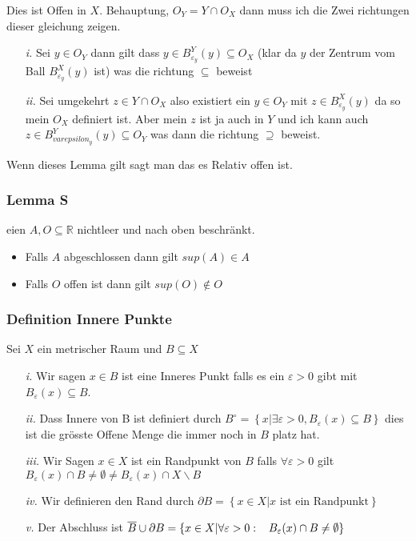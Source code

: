\documentclass{article}
\newcommand{\smspc}{\hspace{0.3cm}}
\newcommand{\lemma}[1]{\subsubsection*{Lemma {#1}}}
\newcommand{\definition}[1]{\subsubsection*{Definition {#1}}}
\begin{document}
Dies ist Offen in $X$. Behauptung, $O_Y=Y\cap O_X$ dann muss ich die Zwei richtungen dieser gleichung zeigen.
\begin{itemize}
  \item[\textit{i.}]{Sei $y\in O_Y$ dann gilt dass $y\in B_{\varepsilon_y}^Y(y)\subseteq O_X$ (klar da $y$ der Zentrum vom Ball $B_{\varepsilon_y}^X(y)$ ist) was die richtung $\subseteq$ beweist}
  \item[\textit{ii.}]{Sei umgekehrt $z\in Y\cap O_X$ also existiert ein $y\in O_Y$ mit $z\in B_{\varepsilon_y}^X(y)$ da so mein $O_X$ definiert ist. Aber mein $z$ ist ja auch in $Y$ und ich kann auch $z\in B_{varepsilon_y}^Y(y)\subseteq O_Y$ was dann die richtung $\supseteq$ beweist.}
\end{itemize}
Wenn dieses Lemma gilt sagt man das es Relativ offen ist.
\lemma Seien $A,O\subseteq \mathbb{R}$ nichtleer und nach oben beschränkt.\begin{itemize}
  \item{Falls $A$ abgeschlossen dann gilt $sup(A)\in A$}
  \item{Falls $O$ offen ist dann gilt $sup(O)\not\in O$}
\end{itemize}
\definition{Innere Punkte} Sei $X$ ein metrischer Raum und $B\subseteq X$ 
\begin{multicols}{2}
\begin{itemize}
  \item[\textit{i.}]{Wir sagen $x\in B$ ist eine Inneres Punkt falls es ein $\varepsilon > 0$ gibt mit $B_\varepsilon(x)\subseteq B$. }
  \item[\textit{ii.}]{Dass Innere von B ist definiert durch $B^\circ=\left\lbrace x|\exists \varepsilon > 0, B_\varepsilon(x)\subseteq B\right\rbrace$ dies ist die grösste Offene Menge die immer noch in $B$ platz hat.}
  \item[\textit{iii.}]{Wir Sagen $x\in X$ ist ein Randpunkt von $B$ falls $\forall \varepsilon > 0$ gilt $B_\varepsilon(x)\cap B\neq\emptyset\neq B_\varepsilon(x)\cap X\backslash B$ }
  \item[\textit{iv.}]{Wir definieren den Rand durch $\partial B=\left\lbrace x\in X|x\text{ ist ein Randpunkt}\right\rbrace$}
  \item[\textit{v.}]{Der Abschluss ist $\overline{ B}\cup \partial B=\left\lbrace x\in X|\forall \varepsilon >0:\smspc B_\varepsilon(x)\cap B\neq\emptyset\right\rbrace$ }
\end{itemize}
\vfill\null\columnbreak\begin{center}
\end{center}
\end{multicols}
\end{document}
